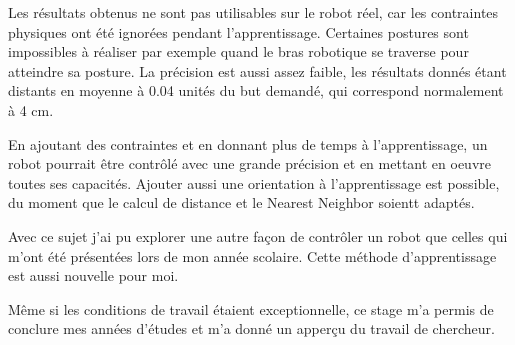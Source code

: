 \documentclass[11pt,french]{report}
\begin{document}
Les résultats obtenus ne sont pas utilisables sur le robot réel, car les contraintes physiques ont été ignorées pendant l'apprentissage.
Certaines postures sont impossibles à réaliser par exemple quand le bras robotique se traverse pour atteindre sa posture.
La précision est aussi assez faible, les résultats donnés étant distants en moyenne à 0.04 unités du but demandé, qui correspond normalement à 4 cm.

En ajoutant des contraintes et en donnant plus de temps à l'apprentissage, un robot pourrait être contrôlé avec une grande précision et en mettant en oeuvre toutes ses capacités.
Ajouter aussi une orientation à l'apprentissage est possible, du moment que le calcul de distance et le Nearest Neighbor soientt adaptés.

Avec ce sujet j'ai pu explorer une autre façon de contrôler un robot que celles qui m'ont été présentées lors de mon année scolaire.
Cette méthode d'apprentissage est aussi nouvelle pour moi.

Même si les conditions de travail étaient exceptionnelle, ce stage m'a permis de conclure mes années d'études et m'a donné un apperçu du travail de chercheur.



\end{document}
